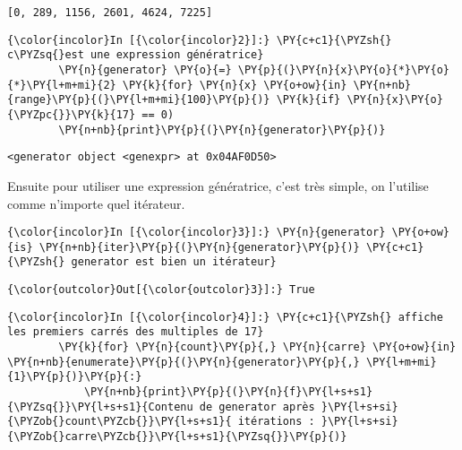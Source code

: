     \begin{Verbatim}[commandchars=\\\{\}]
[0, 289, 1156, 2601, 4624, 7225]

    \end{Verbatim}

    \begin{Verbatim}[commandchars=\\\{\}]
{\color{incolor}In [{\color{incolor}2}]:} \PY{c+c1}{\PYZsh{} c\PYZsq{}est une expression génératrice}
        \PY{n}{generator} \PY{o}{=} \PY{p}{(}\PY{n}{x}\PY{o}{*}\PY{o}{*}\PY{l+m+mi}{2} \PY{k}{for} \PY{n}{x} \PY{o+ow}{in} \PY{n+nb}{range}\PY{p}{(}\PY{l+m+mi}{100}\PY{p}{)} \PY{k}{if} \PY{n}{x}\PY{o}{\PYZpc{}}\PY{k}{17} == 0) 
        \PY{n+nb}{print}\PY{p}{(}\PY{n}{generator}\PY{p}{)}
\end{Verbatim}


    \begin{Verbatim}[commandchars=\\\{\}]
<generator object <genexpr> at 0x04AF0D50>

    \end{Verbatim}

    Ensuite pour utiliser une expression génératrice, c'est très simple, on
l'utilise comme n'importe quel itérateur.

    \begin{Verbatim}[commandchars=\\\{\}]
{\color{incolor}In [{\color{incolor}3}]:} \PY{n}{generator} \PY{o+ow}{is} \PY{n+nb}{iter}\PY{p}{(}\PY{n}{generator}\PY{p}{)} \PY{c+c1}{\PYZsh{} generator est bien un itérateur}
\end{Verbatim}


\begin{Verbatim}[commandchars=\\\{\}]
{\color{outcolor}Out[{\color{outcolor}3}]:} True
\end{Verbatim}
            
    \begin{Verbatim}[commandchars=\\\{\}]
{\color{incolor}In [{\color{incolor}4}]:} \PY{c+c1}{\PYZsh{} affiche les premiers carrés des multiples de 17}
        \PY{k}{for} \PY{n}{count}\PY{p}{,} \PY{n}{carre} \PY{o+ow}{in} \PY{n+nb}{enumerate}\PY{p}{(}\PY{n}{generator}\PY{p}{,} \PY{l+m+mi}{1}\PY{p}{)}\PY{p}{:}
            \PY{n+nb}{print}\PY{p}{(}\PY{n}{f}\PY{l+s+s1}{\PYZsq{}}\PY{l+s+s1}{Contenu de generator après }\PY{l+s+si}{\PYZob{}count\PYZcb{}}\PY{l+s+s1}{ itérations : }\PY{l+s+si}{\PYZob{}carre\PYZcb{}}\PY{l+s+s1}{\PYZsq{}}\PY{p}{)}
\end{Verbatim}


